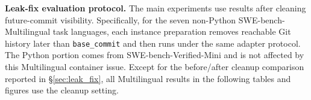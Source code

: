 \textbf{Leak-fix evaluation protocol.}
The main experiments use results after cleaning future-commit visibility. Specifically, for the seven non-Python SWE-bench-Multilingual task languages, each instance preparation removes reachable Git history later than \texttt{base\_commit} and then runs under the same adapter protocol. The Python portion comes from SWE-bench-Verified-Mini and is not affected by this Multilingual container issue. Except for the before/after cleanup comparison reported in \S\ref{sec:leak_fix}, all Multilingual results in the following tables and figures use the cleanup setting.
